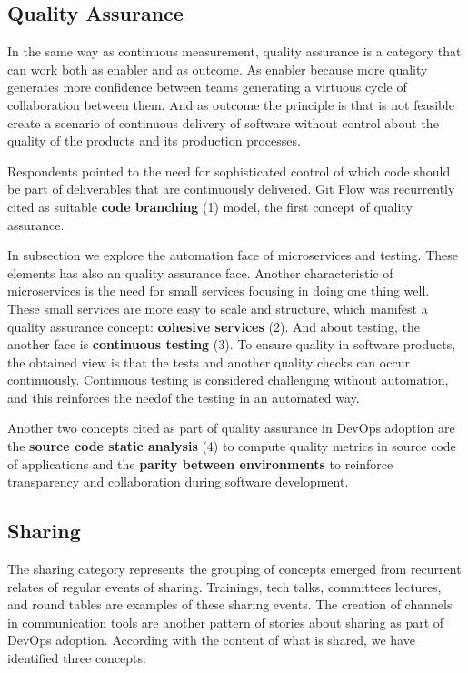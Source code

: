 \subsection{Quality Assurance}

In the same way as continuous measurement, quality assurance is a category that
can work both as enabler and as outcome. As enabler because more quality
generates more confidence between teams generating a virtuous cycle of
collaboration between them. And as outcome the principle is that is not
feasible create a scenario of continuous delivery of software without control
about the quality of the products and its production processes.

Respondents pointed to the need for sophisticated control of which code should
be part of deliverables that are continuously delivered. Git Flow was
recurrently cited as suitable \textbf{code branching} (1) model, the first
concept of quality assurance.

In subsection \label{ssec:automation} we explore the automation face of
microservices and testing. These elements has also an quality assurance face.
Another characteristic of microservices is the need for small services focusing
in doing one thing well. These small services are more easy to scale and
structure, which manifest a quality assurance concept: \textbf{cohesive
services} (2). And about testing, the another face is \textbf{continuous
testing} (3). To ensure quality in software products, the obtained view is that
the tests and another quality checks can occur continuously. Continuous testing
is considered challenging without automation, and this reinforces the needof
the testing in an automated way.

Another two concepts cited as part of quality assurance in DevOps adoption are
the \textbf{source code static analysis} (4) to compute quality metrics in
source code of applications and the \textbf{parity between environments} to
reinforce transparency and collaboration during software development.

\subsection{Sharing}

The sharing category represents the grouping of concepts emerged from recurrent
relates of regular events of sharing. Trainings, tech talks, committees
lectures, and round tables are examples of these sharing events. The creation
of channels in communication tools are another pattern of stories about sharing
as part of DevOps adoption. According with the content of what is shared, we
have identified three concepts:

